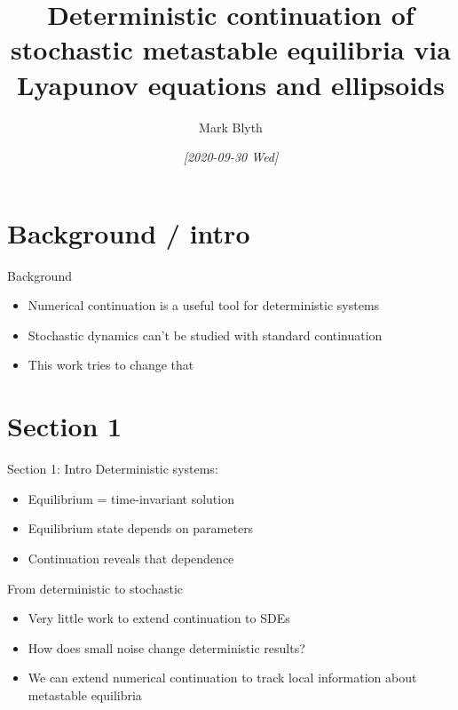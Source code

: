 \documentclass[presentation]{beamer}
\author{Mark Blyth}
\date{\textit{[2020-09-30 Wed]}}
\title{Deterministic continuation of stochastic metastable equilibria via Lyapunov equations and ellipsoids}
\begin{document}
\maketitle

\section{Background / intro}
\label{sec:org68ea7ef}
\begin{frame}[label={sec:org68b1949}]{Background}
\begin{itemize}
\item Numerical continuation is a useful tool for deterministic systems
\end{itemize}
\vfill
\begin{itemize}
\item Stochastic dynamics can't be studied with standard continuation
\end{itemize}
\vfill
\begin{itemize}
\item This work tries to change that
\end{itemize}
\end{frame}

\section{Section 1}
\label{sec:org8791e91}
\begin{frame}[label={sec:orgd74b88a}]{Section 1: Intro}
Deterministic systems:
\vfill
\begin{itemize}
\item Equilibrium = time-invariant solution
\end{itemize}
\vfill
\begin{itemize}
\item Equilibrium state depends on parameters
\end{itemize}
\vfill
\begin{itemize}
\item Continuation reveals that dependence
\end{itemize}
\end{frame}

\begin{frame}[label={sec:org29e5707}]{From deterministic to stochastic}
\begin{itemize}
\item Very little work to extend continuation to SDEs
\end{itemize}
\vfill
\begin{itemize}
\item How does small noise change deterministic results?
\end{itemize}
\vfill
\begin{itemize}
\item We can extend numerical continuation to track local information about metastable equilibria
\end{itemize}
\end{frame}
\end{document}
